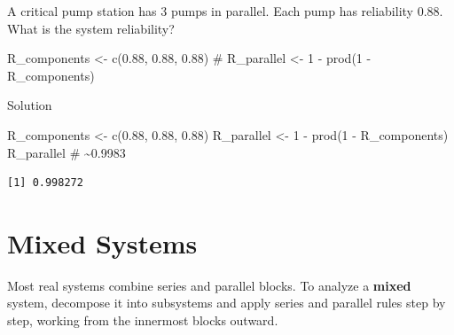 \documentclass[
  letterpaper,
  DIV=11,
  numbers=noendperiod]{scrreprt}
\newenvironment{Shaded}{\begin{snugshade}}{\end{snugshade}}
\newcommand{\CommentTok}[1]{\textcolor[rgb]{0.37,0.37,0.37}{#1}}
\newcommand{\DecValTok}[1]{\textcolor[rgb]{0.68,0.00,0.00}{#1}}
\newcommand{\FloatTok}[1]{\textcolor[rgb]{0.68,0.00,0.00}{#1}}
\newcommand{\FunctionTok}[1]{\textcolor[rgb]{0.28,0.35,0.67}{#1}}
\newcommand{\NormalTok}[1]{\textcolor[rgb]{0.00,0.23,0.31}{#1}}
\newcommand{\OtherTok}[1]{\textcolor[rgb]{0.00,0.23,0.31}{#1}}
\newcommand{\SpecialCharTok}[1]{\textcolor[rgb]{0.37,0.37,0.37}{#1}}
\begin{document}
\begin{tcolorbox}[enhanced jigsaw, arc=.35mm, bottomrule=.15mm, bottomtitle=1mm, breakable, colback=white, colbacktitle=quarto-callout-note-color!10!white, colframe=quarto-callout-note-color-frame, coltitle=black, left=2mm, leftrule=.75mm, opacityback=0, opacitybacktitle=0.6, rightrule=.15mm, title=\textcolor{quarto-callout-note-color}{\faInfo}\hspace{0.5em}{Try It}, titlerule=0mm, toprule=.15mm, toptitle=1mm]

A critical pump station has 3 pumps in parallel. Each pump has
reliability 0.88. What is the system reliability?

\begin{Shaded}
\begin{Highlighting}[]
\NormalTok{R\_components }\OtherTok{\textless{}{-}} \FunctionTok{c}\NormalTok{(}\FloatTok{0.88}\NormalTok{, }\FloatTok{0.88}\NormalTok{, }\FloatTok{0.88}\NormalTok{)}
\CommentTok{\# R\_parallel \textless{}{-} 1 {-} prod(1 {-} R\_components)}
\end{Highlighting}
\end{Shaded}

Solution

\begin{Shaded}
\begin{Highlighting}[]
\NormalTok{R\_components }\OtherTok{\textless{}{-}} \FunctionTok{c}\NormalTok{(}\FloatTok{0.88}\NormalTok{, }\FloatTok{0.88}\NormalTok{, }\FloatTok{0.88}\NormalTok{)}
\NormalTok{R\_parallel }\OtherTok{\textless{}{-}} \DecValTok{1} \SpecialCharTok{{-}} \FunctionTok{prod}\NormalTok{(}\DecValTok{1} \SpecialCharTok{{-}}\NormalTok{ R\_components)}
\NormalTok{R\_parallel  }\CommentTok{\# \textasciitilde{}0.9983}
\end{Highlighting}
\end{Shaded}

\begin{verbatim}
[1] 0.998272
\end{verbatim}

\end{tcolorbox}

\section{Mixed Systems}\label{mixed-systems}

Most real systems combine series and parallel blocks. To analyze a
\textbf{mixed} system, decompose it into subsystems and apply series and
parallel rules step by step, working from the innermost blocks outward.
\end{document}
